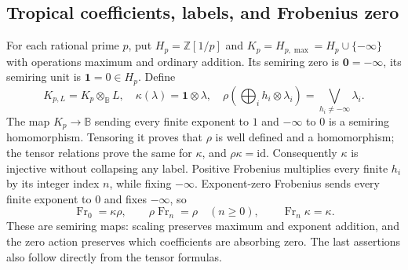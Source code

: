 \subsection{Tropical coefficients, labels, and Frobenius zero}
For each rational prime $p$, put $H_p=\mathbb Z[1/p]$ and
$K_p=H_{p,\max}=H_p\cup\{-\infty\}$ with operations maximum and
ordinary addition. Its semiring zero is $\mathbf0=-\infty$, its
semiring unit is $\mathbf1=0\in H_p$. Define
\begin{equation}\tag{FSC10}
 K_{p,L}=K_p\otimes_{\mathbb B}L,\quad
 \kappa(\lambda)=\mathbf1\otimes\lambda,\quad
 \rho\left(\bigoplus_i h_i\otimes\lambda_i\right)
       =\bigvee_{h_i\ne-\infty}\lambda_i.
\end{equation}
The map $K_p\to\mathbb B$ sending every finite exponent to $1$ and
$-\infty$ to $0$ is a semiring homomorphism. Tensoring it proves that
$\rho$ is well defined and a homomorphism; the tensor relations prove
the same for $\kappa$, and $\rho\kappa=\mathrm{id}$.
Consequently $\kappa$ is injective without collapsing any label.
Positive Frobenius multiplies every finite $h_i$ by its integer
index $n$, while fixing $-\infty$. Exponent-zero Frobenius sends every
finite exponent to $0$ and fixes $-\infty$, so
\begin{equation}\tag{FSC11}
 \operatorname{Fr}_0=\kappa\rho,\qquad
 \rho\operatorname{Fr}_n=\rho\quad(n\ge0),\qquad
 \operatorname{Fr}_n\kappa=\kappa.
\end{equation}
These are semiring maps: scaling preserves maximum and exponent
addition, and the zero action preserves which coefficients are
absorbing zero. The last assertions also follow directly from the
tensor formulas.


